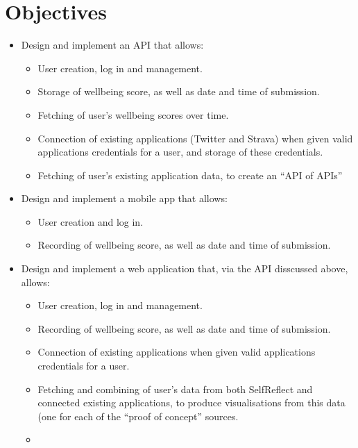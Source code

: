 \documentclass[11pt,openright,a4paper]{report}
\begin{document}
\section{Objectives} \label{objectives}
\begin{itemize}

\item Design and implement an API that allows:
\begin{itemize}
  \item User creation, log in and management.
  \item Storage of wellbeing score, as well as date and time of submission.
  \item Fetching of user's wellbeing scores over time.
  \item Connection of existing applications (Twitter and Strava) when given valid applications credentials for a user, and storage of these credentials.
  \item Fetching of user's existing application data, to create an \enquote{API of APIs}
\end{itemize} 
  
\item Design and implement a mobile app that allows:
\begin{itemize}
  \item User creation and log in.
  \item Recording of wellbeing score, as well as date and time of submission.
\end{itemize}

\item Design and implement a web application that, via the API disscussed above, allows:
\begin{itemize}
  \item User creation, log in and management.
  \item Recording of wellbeing score, as well as date and time of submission.
  \item Connection of existing applications when given valid applications credentials for a user.
  \item Fetching and combining of user's data from both SelfReflect and connected existing applications, to produce visualisations from this data (one for each of the \enquote{proof of concept} sources.
  \item 
\end{itemize} 


\end{itemize}
\end{document}
